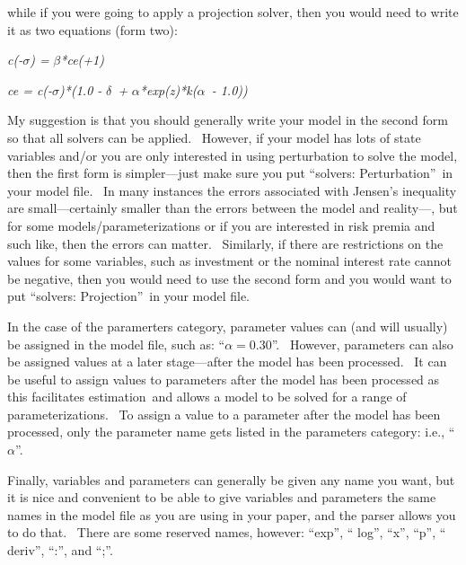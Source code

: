 \documentclass[notitlepage,11pt]{article}
\begin{document}
\bigskip

while if you were going to apply a projection solver, then you would need to
write it as two equations (form two):

\bigskip

\textit{c(-}$\sigma $\textit{) = }$\beta $\textit{*ce(+1)}

\textit{ce = c(-}$\sigma $\textit{)*(1.0 - }$\delta $\textit{\ + }%
$\alpha $\textit{*exp(z)*k(}$\alpha $\textit{\ - 1.0))}

\bigskip

My suggestion is that you should generally write your model in the second
form so that all solvers can be applied. \ However, if your model has lots
of state variables and/or you are only interested in using perturbation to
solve the model, then the first form is simpler---just make sure you put
\textquotedblleft solvers: Perturbation\textquotedblright\ in your model
file. \ In many instances the errors associated with Jensen's inequality are
small---certainly smaller than the errors between the model and reality---,
but for some models/parameterizations or if you are interested in risk
premia and such like, then the errors can matter. \ Similarly, if there are
restrictions on the values for some variables, such as investment or the
nominal interest rate cannot be negative, then you would need to use the
second form and you would want to put \textquotedblleft solvers:
Projection\textquotedblright\ in your model file.

In the case of the paramerters category, parameter values can (and will
usually) be assigned in the model file, such as: \textquotedblleft $\alpha
=0.30$\textquotedblright . \ However, parameters can also be assigned values
at a later stage---after the model has been processed. \ It can be useful to
assign values to parameters after the model has been processed as this
facilitates estimation\ and allows a model to be solved for a range of
parameterizations. \ To assign a value to a parameter after the model has
been processed, only the parameter name gets listed in the parameters
category: i.e., \textquotedblleft $\alpha $\textquotedblright .

Finally, variables and parameters can generally be given any name you want,
but it is nice and convenient to be able to give variables and parameters
the same names in the model file as you are using in your paper, and the
parser allows you to do that. \ There are some reserved names, however:
\textquotedblleft exp\textquotedblright , \textquotedblleft
log\textquotedblright , \textquotedblleft x\textquotedblright ,
\textquotedblleft p\textquotedblright , \textquotedblleft
deriv\textquotedblright , \textquotedblleft :\textquotedblright , and
\textquotedblleft ;\textquotedblright . 
\end{document}
